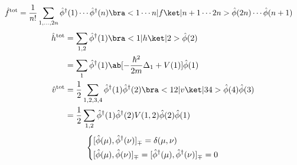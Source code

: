 \documentclass[uplatex,dvipdfmx,a4paper,11pt]{jlreq}
\numberwithin{equation}{section}
\theoremstyle{definition}
\begin{document}
\begin{align}
  \hat{f}^{\mathrm{tot}} & = \frac{1}{n!}\sum_{1,\ldots,2n}\hat{\phi}^\dagger(1)\cdots\hat{\phi}^\dagger(n)\bra<1\cdots n|f\ket|n+1\cdots 2n>\hat{\phi}(2n)\cdots\hat{\phi}(n+1)
\end{align}
\begin{align}
  \hat{h}^{\mathrm{tot}} & = \sum_{1,2}\hat{\phi}^\dagger(1)\bra<1|h\ket|2>\hat{\phi}(2)                                                    \\
                         & = \sum_{1}\hat{\phi}^\dagger(1)\ab[-\frac{\hbar^2}{2m}\Delta_{1} + V(1)]\hat{\phi}(1)                            \\
  \hat{v}^{\mathrm{tot}} & = \frac{1}{2}\sum_{1,2,3,4}\hat{\phi}^\dagger(1)\hat{\phi}^\dagger(2)\bra<12|v\ket|34>\hat{\phi}(4)\hat{\phi}(3) \\
                         & = \frac{1}{2}\sum_{1,2}\hat{\phi}^\dagger(1)\hat{\phi}^\dagger(2)V(1, 2)\hat{\phi}(2)\hat{\phi}(1)
\end{align}
\begin{align}
  \begin{dcases}
    [\hat{\phi}(\mu), \hat{\phi}^\dagger(\nu)]_\mp = \delta(\mu, \nu) \\
    [\hat{\phi}(\mu), \hat{\phi}(\nu)]_\mp = [\hat{\phi}^\dagger(\mu), \hat{\phi}^\dagger(\nu)]_\mp = 0
  \end{dcases}
\end{align}
\end{document}
